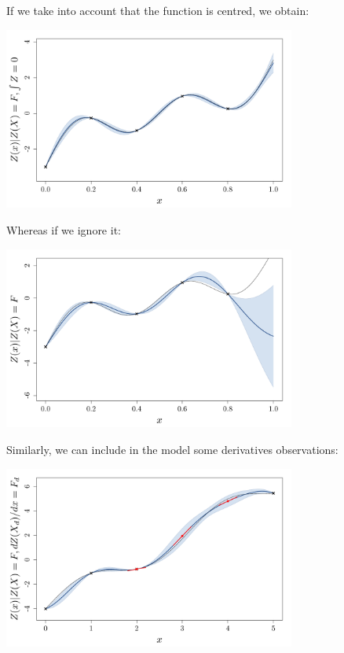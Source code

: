 \documentclass{beamer}
\begin{document}
\begin{frame}{}
\begin{example}
	If we take into account that the function is centred, we obtain:
	\begin{center}
	\includegraphics[height=6cm]{figures/R/exotic_int}
	\end{center}
\end{example}
\end{frame}

\begin{frame}{}
\begin{example}
	Whereas if we ignore it:
	\begin{center}
	\includegraphics[height=6cm]{figures/R/exotic_pasint}
	\end{center}
\end{example}
\end{frame}

\begin{frame}{}
Similarly, we can include in the model some derivatives observations:
	\begin{center}
	\includegraphics[height=6cm]{figures/R/exotic_der}
	\end{center}
\end{frame}
\end{document}
